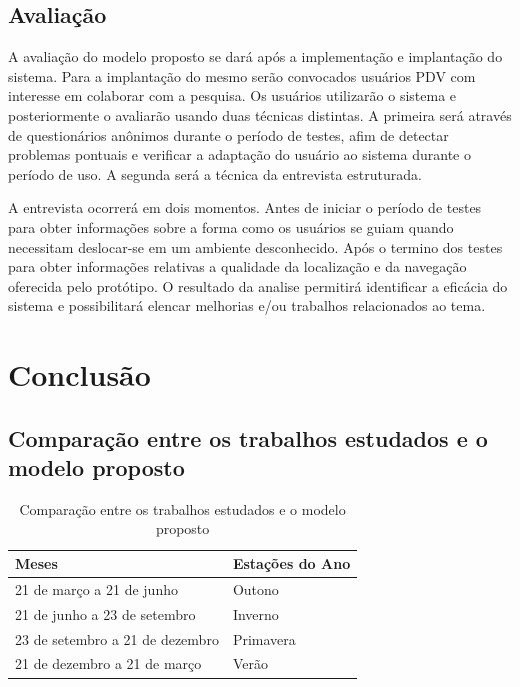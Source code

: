 \documentclass[english,brazilian]{UNISINOSmonografia}
\begin{document}
	\section{Avaliação}
A avaliação do modelo proposto se dará após a implementação e implantação do sistema. Para a implantação do mesmo serão convocados usuários PDV com interesse em colaborar com a pesquisa. Os usuários utilizarão o sistema e posteriormente o avaliarão usando duas técnicas distintas. A primeira será através de questionários anônimos durante o período de testes, afim de detectar problemas pontuais e verificar a adaptação do usuário ao sistema durante o período de uso. A segunda será a técnica da entrevista estruturada. 

A entrevista ocorrerá em dois momentos. Antes de iniciar o período de testes para obter informações sobre a forma como os usuários se guiam quando necessitam deslocar-se em um ambiente desconhecido. Após o termino dos testes para obter informações relativas a qualidade da localização e da navegação oferecida pelo protótipo. O resultado da analise permitirá identificar a eficácia do sistema e possibilitará elencar melhorias e/ou trabalhos relacionados ao tema.









\chapter{Conclusão}

\section{Comparação entre os trabalhos estudados e o modelo proposto}

	\begin{table}
		\caption{Comparação entre os trabalhos estudados e o modelo proposto}
		\centering%
		\begin{minipage}{.6\textwidth}
			\begin{tabular*}{\textwidth}{ll}
				\hline
				\textbf{Meses} & \textbf{Estações do Ano}\\
				\hline
				21 de março a 21 de junho & Outono\\
				21 de junho a 23 de setembro & Inverno\\
				23 de setembro a 21 de dezembro & Primavera\\
				21 de dezembro a 21 de março & Verão\\
				\hline
			\end{tabular*}
		\end{minipage}
	\end{table}
	
\end{document}
